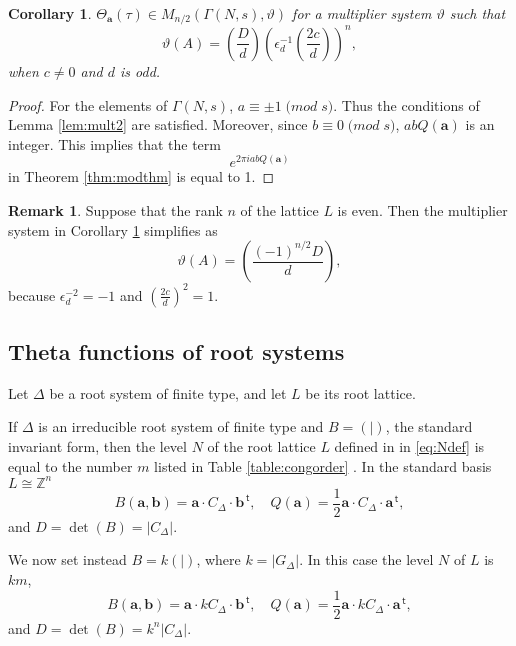 \documentclass{article}
\newtheorem{corollary}[theorem]{Corollary}
\theoremstyle{definition}
\newtheorem{remark}[theorem]{Remark}
\newcommand{\ZZ} {{\mathbb Z}}		%
\renewcommand{\top}{\,\mathsf{t}}
\begin{document}
\begin{corollary}
\label{cor:mult3} 
$\Theta_{\mathbf{a}}(\tau) \in M_{n/2}(\Gamma(N,s), \vartheta)$
for a multiplier system $\vartheta$ such that
\[ \vartheta(A)= \left(\frac{D}{d}\right)\left(\epsilon^{-1}_d 
\left(\frac{2c}{d}\right)\right)^n, \]
when $c \neq 0$ and $d$ is odd.
\end{corollary}
\begin{proof}
For the elements of $\Gamma(N,s)$, $a \equiv \pm 1 \; \mathrm(mod\; s)$. Thus the conditions 
of Lemma \ref{lem:mult2} are satisfied. Moreover, since $b \equiv 0 \; \mathrm(mod\; s)$, 
$ab Q(\mathbf{a})$ is an integer. This implies that the term 
\[ e^{2 \pi i ab Q(\mathbf{a})} \]
in Theorem \ref{thm:modthm} is equal to 1.
\end{proof}

\begin{remark} 
\label{rmk:multsyseven}	
Suppose that the rank $n$ of the lattice $L$ is even.
Then the multiplier system in Corollary \ref{cor:mult3} simplifies as
\[ \vartheta(A)= \left( \frac{(-1)^{n/2} D}{d} \right), \]
because	$\epsilon_d^{-2}=-1$ and $\left( \frac{2c}{d}\right)^2=1$.
\end{remark}

\subsection{Theta functions of root systems}

Let $\Delta$  be a root system of finite type, and let $L$ be its root lattice. 

If $\Delta$ is an irreducible root system of finite type and $B=(|)$, the standard invariant
form, then the level $N$ of the root lattice $L$ defined in in \eqref{eq:Ndef} is equal to
the number $m$ listed in Table \ref{table:congorder} \cite[page 261]{kac1994infinite}. In the
standard basis  $L\cong  \ZZ^n$
\[ B(\mathbf{a},\mathbf{b})=\mathbf{a}\cdot C_{\Delta} \cdot \mathbf{b}^{\top}, 
\quad Q(\mathbf{a})=\frac{1}{2}\mathbf{a}\cdot C_{\Delta} \cdot \mathbf{a}^{\top}, \]
and $D=\det(B)=|C_{\Delta}|$.


We now set instead $B=k(|)$, where $k=|G_{\Delta}|$. 
In this case the level $N$ of $L$ is $km$,
\[ B(\mathbf{a},\mathbf{b})=\mathbf{a}\cdot kC_{\Delta} \cdot \mathbf{b}^{\top}, 
\quad Q(\mathbf{a})=\frac{1}{2}\mathbf{a}\cdot kC_{\Delta} \cdot \mathbf{a}^{\top}, \]
and $D=\det(B)=k^n|C_{\Delta}|$.
\end{document}
